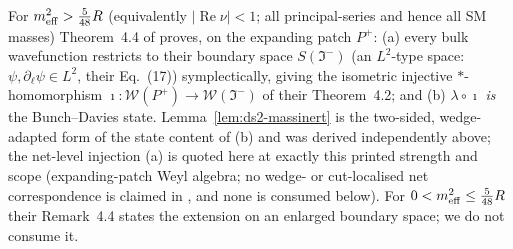 \begin{remark}
\label{rem:ds2-dmp}
For $m^2_{\rm eff}>\tfrac{5}{48}R$ (equivalently $|\operatorname{Re}
\nu|<1$; all principal-series and hence all SM masses) Theorem~4.4
of \cite{DappiaggiMorettiPinamonti2009} proves, on the expanding
patch $P^+$: (a) every bulk wavefunction restricts to their boundary
space $S(\Im^-)$ (an $L^2$-type space: $\psi,\partial_\ell\psi\in L^2$,
their Eq.\ (17)) symplectically, giving the isometric injective
$*$-homomorphism $\imath:\mathcal W(P^+)\to\mathcal W(\Im^-)$ of
their Theorem~4.2; and (b) $\lambda\circ\imath$ \emph{is} the
Bunch--Davies state. Lemma~\ref{lem:ds2-massinert} is the
two-sided, wedge-adapted form of the state content of (b) and was
derived independently above; the net-level injection (a) is quoted
here at exactly this printed strength and scope (expanding-patch
Weyl algebra; no wedge- or cut-localised net correspondence is
claimed in \cite{DappiaggiMorettiPinamonti2009}, and none is
consumed below). For $0<m^2_{\rm eff}\le\tfrac{5}{48}R$ their
Remark~4.4 states the extension on an enlarged boundary space; we do
not consume it.
\end{remark}


